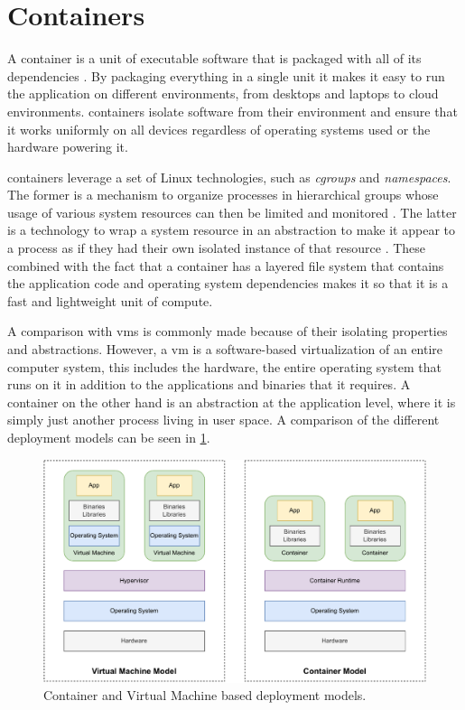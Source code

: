 \section{Containers}
\label{sec:background:containers}


A \gls{container} is a unit of executable software that is packaged with all of its dependencies \cite{docker-what-is-container, ibm-what-is-container}. By packaging everything in a single unit it makes it easy to run the application on different environments, from desktops and laptops to cloud environments. \Glspl{container} isolate software from their environment and ensure that it works uniformly on all devices regardless of operating systems used or the hardware powering it. 




\Glspl{container} leverage a set of Linux technologies, such as \textit{cgroups} and \textit{namespaces}. The former is a mechanism to organize processes in hierarchical groups whose usage of various system resources can then be limited and monitored \cite{cgroups, man-cgroups}. The latter is a technology to wrap a system resource in an abstraction to make it appear to a process as if they had their own isolated instance of that resource \cite{man-namespaces}. These combined with the fact that a container has a layered file system that contains the application code and operating system dependencies makes it so that it is a fast and lightweight unit of compute. 

A comparison with \glspl{vm} is commonly made because of their isolating properties and abstractions. However, a \gls{vm} is a software-based virtualization of an entire computer system, this includes the hardware, the entire operating system that runs on it in addition to the applications and binaries that it requires. A \gls{container} on the other hand is an abstraction at the application level, where it is simply just another process living in user space. A comparison of the different deployment models can be seen in \ref{fig:vm-vs-container}.


\begin{figure}[!t]
    \centering
    
    \includegraphics[width=.9\linewidth]{2_background/figures/vm-vs-container.pdf}

    \caption{Container and Virtual Machine based deployment models.}
    \label{fig:vm-vs-container}
\end{figure}

